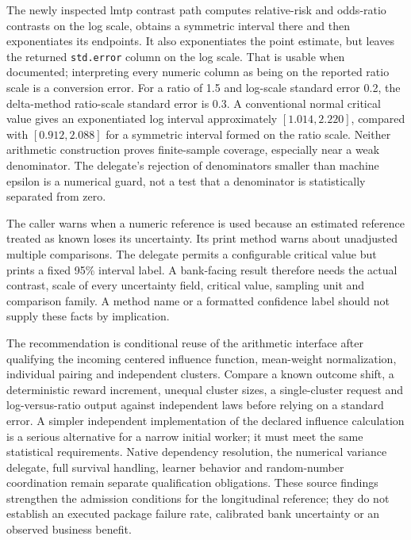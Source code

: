 The newly inspected lmtp contrast path computes relative-risk and odds-ratio
contrasts on the log scale, obtains a symmetric interval there and then
exponentiates its endpoints. It also exponentiates the point estimate, but
leaves the returned \texttt{std.error} column on the log scale. That is usable
when documented; interpreting every numeric column as being on the reported
ratio scale is a conversion error. For a ratio of 1.5 and log-scale standard
error 0.2, the delta-method ratio-scale standard error is 0.3. A conventional
normal critical value gives an exponentiated log interval approximately
$[1.014,2.220]$, compared with $[0.912,2.088]$ for a symmetric interval formed
on the ratio scale. Neither arithmetic construction proves finite-sample
coverage, especially near a weak denominator. The delegate's rejection of
denominators smaller than machine epsilon is a numerical guard, not a test
that a denominator is statistically separated from zero.
\citep{rel23ifecaller,rel23ife,rel23ifewitness}

The caller warns when a numeric reference is used because an estimated
reference treated as known loses its uncertainty. Its print method warns
about unadjusted multiple comparisons. The delegate permits a configurable
critical value but prints a fixed 95\% interval label. A bank-facing result
therefore needs the actual contrast, scale of every uncertainty field,
critical value, sampling unit and comparison family. A method name or a
formatted confidence label should not supply these facts by implication.
\citep{rel23ifecaller,rel23ife}

The recommendation is conditional reuse of the arithmetic interface after
qualifying the incoming centered influence function, mean-weight normalization,
individual pairing and independent clusters. Compare a known outcome shift,
a deterministic reward increment, unequal cluster sizes, a single-cluster
request and log-versus-ratio output against independent laws before relying
on a standard error. A simpler independent implementation of the declared
influence calculation is a serious alternative for a narrow initial worker;
it must meet the same statistical requirements. Native dependency resolution,
the numerical variance delegate, full survival handling, learner behavior and
random-number coordination remain separate qualification obligations. These
source findings strengthen the admission conditions for the longitudinal
reference; they do not establish an executed package failure rate, calibrated
bank uncertainty or an observed business benefit.
\citep{rel23ife,rel23ifecaller,rel23ifewitness}


